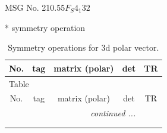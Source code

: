 \documentclass[fleqn,8pt]{jsarticle}
\begin{document}
\setcounter{MaxMatrixCols}{32}

\renewcommand{\tablename}{Table~}
\renewcommand{\figurename}{Figure~}
\begin{center}
\LARGE
MSG No. 210.55\quad$F_{S}4_{1}32$
\end{center}
* symmetry operation
\renewcommand{\arraystretch}{1.3}
\begin{longtable}{ccccc}
\caption{Symmetry operations for 3d polar vector.}
 \\
 \hline \hline
No. & tag & matrix (polar) & det & TR \\ \hline \endfirsthead

\multicolumn{4}{l}{\tablename\ \thetable{}} \\
 \hline \hline
No. & tag & matrix (polar) & det & TR \\ \hline \endhead

 \hline \hline
\multicolumn{4}{r}{\footnotesize\it continued ...} \\ \endfoot

 \hline \hline
\multicolumn{4}{r}{} \\ \endlastfoot


\end{longtable}
\end{document}
